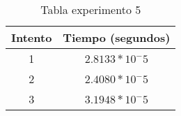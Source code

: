 \begin{table}[!ht]
\begin{center}
\begin{tabular}{|c|c|} \hline 
\textbf{Intento} & \textbf{Tiempo (segundos)} \\  \hline
1 & $2.8133*10^-5$ \\%
2 & $2.4080*10^-5$ \\%
3 & $3.1948*10^-5$ \\%
\hline
\end{tabular}
\end{center}
\caption{Tabla experimento 5}
\label{Mitabla5}
\end{table}

